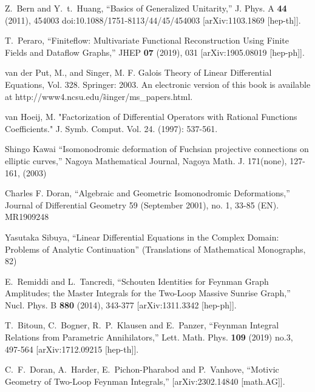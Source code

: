 \documentclass[a4paper,12pt]{article}
\numberwithin{equation}{section}
\numberwithin{figure}{section}
\begin{document}
\begin{thebibliography}{99}

Z.~Bern and Y.~t.~Huang,
``Basics of Generalized Unitarity,''
J. Phys. A \textbf{44} (2011), 454003
doi:10.1088/1751-8113/44/45/454003
[arXiv:1103.1869 [hep-th]].
  
T.~Peraro,
``Finiteflow: Multivariate Functional Reconstruction Using Finite Fields and Dataflow Graphs,''
JHEP \textbf{07} (2019), 031
[arXiv:1905.08019 [hep-ph]].

  
 van der Put, M., and Singer, M. F. Galois Theory of Linear Differential Equations, Vol. 328. Springer: 2003. An electronic version of this book is available at http://www4.ncsu.edu/\~singer/ms\_papers.html.

  van Hoeij, M. "Factorization of Differential Operators with Rational Functions Coefficients." J. Symb. Comput. Vol. 24. (1997): 537-561.

  
 Shingo Kawai ``Isomonodromic deformation of Fuchsian projective connections on elliptic curves,'' Nagoya Mathematical Journal, Nagoya Math. J. 171(none), 127-161, (2003)
  
 Charles F. Doran, ``Algebraic and Geometric Isomonodromic Deformations,'' Journal of Differential Geometry 59 (September 2001), no. 1, 33-85 (EN). MR1909248
   
   Yasutaka Sibuya, ``Linear Differential Equations in the Complex Domain: Problems of Analytic Continuation'' (Translations of Mathematical Monographs, 82)

E.~Remiddi and L.~Tancredi,
``Schouten Identities for Feynman Graph Amplitudes; the Master Integrals for the Two-Loop Massive Sunrise Graph,''
Nucl. Phys. B \textbf{880} (2014), 343-377
[arXiv:1311.3342 [hep-ph]].

  
T.~Bitoun, C.~Bogner, R.~P.~Klausen and E.~Panzer,
``Feynman Integral Relations from Parametric Annihilators,''
Lett. Math. Phys. \textbf{109} (2019) no.3, 497-564
[arXiv:1712.09215 [hep-th]].

C.~F.~Doran, A.~Harder, E.~Pichon-Pharabod and P.~Vanhove,
``Motivic Geometry of Two-Loop Feynman Integrals,''
[arXiv:2302.14840 [math.AG]].


\end{thebibliography}
\end{document}
